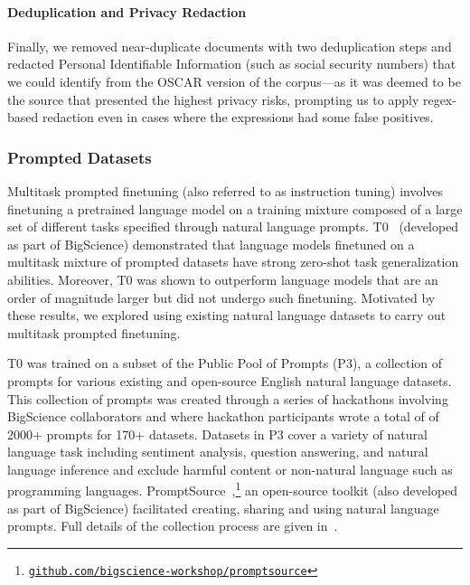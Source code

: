 \paragraph{Deduplication and Privacy Redaction} Finally, we removed near-duplicate documents with two deduplication steps and redacted Personal Identifiable Information (such as social security numbers) that we could identify from the OSCAR version of the corpus---as it was deemed to be the source that presented the highest privacy risks, prompting us to apply regex-based redaction even in cases where the expressions had some false positives.  

\subsubsection{Prompted Datasets}
\label{sec:prompted-data}

Multitask prompted finetuning (also referred to as instruction tuning) involves finetuning a pretrained language model on a training mixture composed of a large set of different tasks specified through natural language prompts. T0~\citep{sanh2022multitask} (developed as part of BigScience) demonstrated that language models finetuned on a multitask mixture of prompted datasets have strong zero-shot task generalization abilities. Moreover, T0 was shown to outperform language models that are an order of magnitude larger but did not undergo such finetuning. Motivated by these results, we explored using existing natural language datasets to carry out multitask prompted finetuning. 

T0 was trained on a subset of the Public Pool of Prompts (P3), a collection of prompts for various existing and open-source English natural language datasets. This collection of prompts was created through a series of hackathons involving BigScience collaborators and where hackathon participants wrote a total of of 2000+ prompts for 170+ datasets. Datasets in P3 cover a variety of natural language task including sentiment analysis, question answering, and natural language inference and exclude harmful content or non-natural language such as programming languages. PromptSource~\citep{bach2022promptsource},\footnote{\href{https://github.com/bigscience-workshop/promptsource}{\texttt{github.com/bigscience-workshop/promptsource}}} an open-source toolkit (also developed as part of BigScience) facilitated creating, sharing and using natural language prompts. Full details of the collection process are given in~\citep{sanh2022multitask,bach2022promptsource}.  

